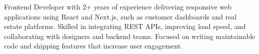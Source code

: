 Frontend Developer with 2+ years of experience delivering responsive web applications using React and Next.js, such as customer dashboards and real estate platforms. Skilled in integrating REST APIs, improving load speed, and collaborating with designers and backend teams. Focused on writing maintainable code and shipping features that increase user engagement.
